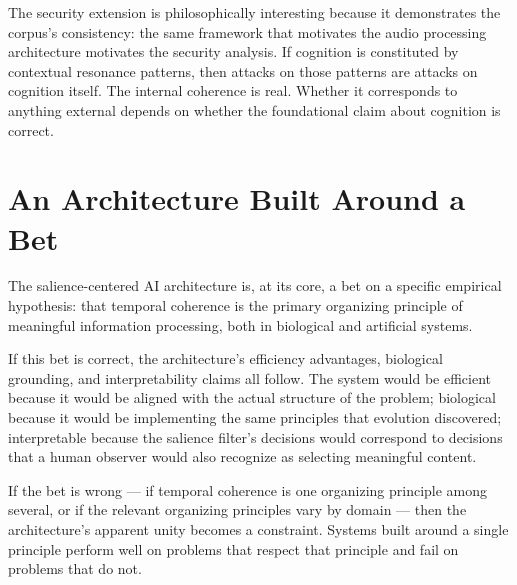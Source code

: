 

The security extension is philosophically interesting because
it demonstrates the corpus's consistency: the same framework
that motivates the audio processing architecture motivates
the security analysis. If cognition is constituted by
contextual resonance patterns, then attacks on those patterns
are attacks on cognition itself. The internal coherence is
real. Whether it corresponds to anything external depends
on whether the foundational claim about cognition is correct.

\section{An Architecture Built Around a Bet}
\label{sec:architecture-bet}

The salience-centered AI architecture is, at its core, a bet
on a specific empirical hypothesis: that temporal coherence
is the primary organizing principle of meaningful information
processing, both in biological and artificial systems.

If this bet is correct, the architecture's efficiency
advantages, biological grounding, and interpretability
claims all follow. The system would be efficient because
it would be aligned with the actual structure of the problem;
biological because it would be implementing the same
principles that evolution discovered; interpretable because
the salience filter's decisions would correspond to decisions
that a human observer would also recognize as selecting
meaningful content.

If the bet is wrong --- if temporal coherence is one
organizing principle among several, or if the relevant
organizing principles vary by domain --- then the architecture's
apparent unity becomes a constraint. Systems built around
a single principle perform well on problems that respect
that principle and fail on problems that do not.

